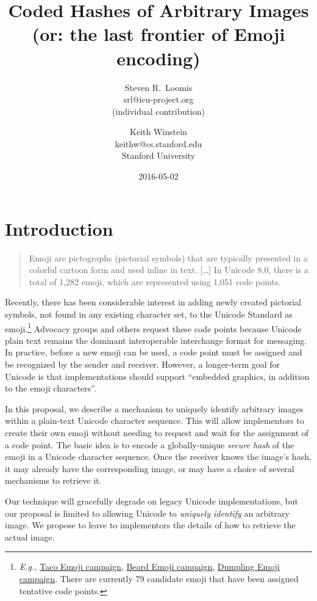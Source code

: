 \documentclass[12pt]{article}
\title{Coded Hashes of Arbitrary Images\\\normalsize \sf (or: the last frontier of Emoji encoding)}
\author{
Steven R.~Loomis\\
\small srl@icu-project.org\\
\small (individual contribution)\\
\and
Keith Winstein\\
\small keithw@cs.stanford.edu\\
\small Stanford University\\
}
\date{2016-05-02}                                           %
\begin{document}
\maketitle

\section{Introduction}

\begin{quote}
Emoji are pictographs (pictorial symbols) that are typically presented
in a colorful cartoon form and used inline in text. [\ldots] In
Unicode 8.0, there is a total of 1,282 emoji, which are represented
using 1,051 code points.\autocite{UTR51}
\end{quote}

Recently, there has been considerable interest in adding newly created
pictorial symbols, not found in any existing character set, to the
Unicode Standard as emoji.\footnote{\textit{E.g.,}
  \href{https://www.change.org/p/unicode-consortium-the-taco-emoji-needs-to-happen-aeb4ebc7-a323-441d-90b9-20b90c83a8c6}{Taco
    Emoji campaign}, \href{http://www.beardemoji.com/}{Beard Emoji
    campaign}, \href{http://www.dumplingemoji.org}{Dumpling Emoji
    campaign}. There are currently 79 candidate emoji that have been
  assigned tentative code points.} Advocacy groups and others request
these code points because Unicode plain text remains the dominant
interoperable interchange format for messaging. In practice, before a
new emoji can be used, a code point must be assigned and be recognized
by the sender and receiver. However, a longer-term goal for Unicode is
that implementations should support ``embedded graphics, in addition
to the emoji characters''\autocite[Section 8, ``Longer Term
  Solutions'']{UTR51}.

In this proposal, we describe a mechanism to uniquely identify
arbitrary images within a plain-text Unicode character sequence. This
will allow implementors to create their own emoji without needing to
request and wait for the assignment of a code point. The basic idea is
to encode a globally-unique \emph{secure hash} of the emoji in a
Unicode character sequence. Once the receiver knows the image's hash,
it may already have the corresponding image, or may have a choice of
several mechanisms to retrieve it.

Our technique will gracefully degrade on legacy Unicode
implementations, but our proposal is limited to allowing Unicode to
\emph{uniquely identify} an arbitrary image. We propose to leave to
implementors the details of how to retrieve the actual image.
\end{document}

